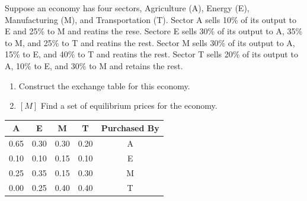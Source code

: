 \documentclass{../mathhomework}
\begin{document}
\maketitle

\pagebreak

\begin{problem}[1.6\#4]
    Suppose an economy has four sectors, Agriculture (A), Energy (E), Manufacturing (M), and Transportation (T). 
    Sector A sells 10\% of its output to E and 25\% to M and reatins the rese. Sectore E sells 30\% of its output
    to A, 35\% to M, and 25\% to T and reatins the rest. Sector M sells 30\% of its output to A, 15\% to E, and 40\%
    to T and reatins the rest. Sector T sells 20\% of its output to A, 10\% to E, and 30\% to M and retains the rest.
    \begin{enumerate}[label=\alph*.]
        \item Construct the exchange table for this economy.
        \item $[M]$ Find a set of equilibrium prices for the economy.
    \end{enumerate}

    \begin{solution}[Part A:]
        \begin{table}[h!]
            \begin{tabular}{|c|c|c|c|c|}
            \hline
            A    & E    & M    & T    & Purchased By \\ \hline
            0.65 & 0.30 & 0.30 & 0.20 & A            \\ \hline
            0.10 & 0.10 & 0.15 & 0.10 & E            \\ \hline
            0.25 & 0.35 & 0.15 & 0.30 & M            \\ \hline
            0.00 & 0.25 & 0.40 & 0.40 & T            \\ \hline
            \end{tabular}
        \end{table}
    \end{solution}


\end{problem}
\end{document}
